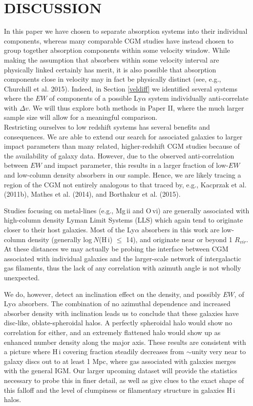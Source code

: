 \documentclass[twocolumn,tighten]{aastex6}
\begin{document}
\section{DISCUSSION}


In this paper we have chosen to separate absorption systems into their individual components, whereas many comparable CGM studies have instead chosen to group together absorption components within some velocity window. While making the assumption that absorbers within some velocity interval are physically linked certainly has merit, it is also possible that absorption components close in velocity may in fact be physically distinct (see, e.g., Churchill et al. 2015). Indeed, in Section \ref{veldiff} we identified several systems where the $EW$ of components of a possible Ly$\alpha$ system individually anti-correlate with $\Delta v$. We will thus explore both methods in Paper II, where the much larger sample size will allow for a meaningful comparison.\\

Restricting ourselves to low redshift systems has several benefits and consequences. We are able to extend our search for associated galaxies to larger impact parameters than many related, higher-redshift CGM studies because of the availability of galaxy data. However, due to the observed anti-correlation between $EW$ and impact parameter, this results in a larger fraction of low-$EW$ and low-column density absorbers in our sample. Hence, we are likely tracing a region of the CGM not entirely analogous to that traced by, e.g., Kacprzak et al. (2011b), Mathes et al. (2014), and Borthakur et al. (2015).

Studies focusing on metal-lines (e.g., Mg\,{\sc ii} and O\,{\sc vi}) are generally associated with high-column density Lyman Limit Systems (LLS) which again tend to originate closer to their host galaxies. Most of the Ly$\alpha$ absorbers in this work are low-column density (generally log$~N$(H\,{\sc i}) $\leq$ 14), and originate near or beyond 1 $R_{vir}$. At these distances we may actually be probing the interface between CGM associated with individual galaxies and the larger-scale network of intergalactic gas filaments, thus the lack of any correlation with azimuth angle is not wholly unexpected.

We do, however, detect an inclination effect on the density, and possibly $EW$, of Ly$\alpha$ absorbers. The combination of no azimuthal dependence and increased absorber density with inclination leads us to conclude that these galaxies have disc-like, oblate-spheroidal halos. A perfectly spheroidal halo would show no correlation for either, and an extremely flattened halo would show up as enhanced number density along the major axis. These results are consistent with a picture where H\,{\sc i} covering fraction steadily decreases from $\sim$unity very near to galaxy discs out to at least 1 Mpc, where gas associated with galaxies merges with the general IGM. Our larger upcoming dataset will provide the statistics necessary to probe this in finer detail, as well as give clues to the exact shape of this falloff and the level of clumpiness or filamentary structure in galaxies H\,{\sc i} halos.
\end{document}
